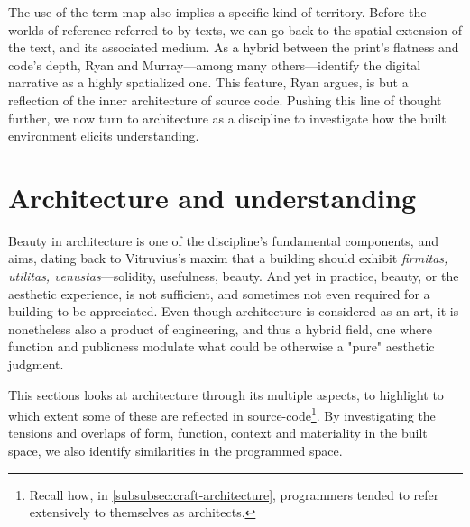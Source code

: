 The use of the term map also implies a specific kind of territory. Before the worlds of reference referred to by texts, we can go back to the spatial extension of the text, and its associated medium. As a hybrid between the print's flatness and code's depth, Ryan and Murray—among many others—identify the digital narrative as a highly spatialized one. This feature, Ryan argues, is but a reflection of the inner architecture of source code. Pushing this line of thought further, we now turn to architecture as a discipline to investigate how the built environment elicits understanding.

\section{Architecture and understanding}
\label{sec:arch-understanding}

Beauty in architecture is one of the discipline's fundamental components, and aims, dating back to Vitruvius's maxim that a building should exhibit \emph{firmitas, utilitas, venustas}—solidity, usefulness, beauty. And yet in practice, beauty, or the aesthetic experience, is not sufficient, and sometimes not even required for a building to be appreciated. Even though architecture is considered as an art, it is nonetheless also a product of engineering, and thus a hybrid field, one where function and publicness modulate what could be otherwise a "pure" aesthetic judgment.

This sections looks at architecture through its multiple aspects, to highlight to which extent some of these are reflected in source-code\footnote{Recall how, in \ref{subsubsec:craft-architecture}, programmers tended to refer extensively to themselves as architects.}. By investigating the tensions and overlaps of form, function, context and materiality in the built space, we also identify similarities in the programmed space.



